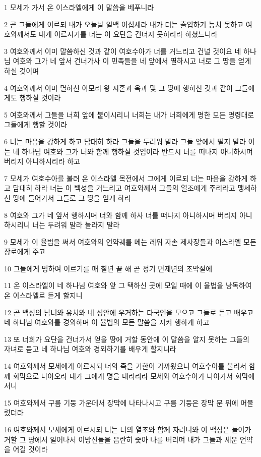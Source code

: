 \par 1 모세가 가서 온 이스라엘에게 이 말씀을 베푸니라
\par 2 곧 그들에게 이르되 내가 오늘날 일백 이십세라 내가 더는 출입하기 능치 못하고 여호와께서도 내게 이르시기를 너는 이 요단을 건너지 못하리라 하셨느니라
\par 3 여호와께서 이미 말씀하신 것과 같이 여호수아가 너를 거느리고 건널 것이요 네 하나님 여호와 그가 네 앞서 건너가사 이 민족들을 네 앞에서 멸하시고 너로 그 땅을 얻게 하실 것이며
\par 4 여호와께서 이미 멸하신 아모리 왕 시혼과 옥과 및 그 땅에 행하신 것과 같이 그들에게도 행하실 것이라
\par 5 여호와께서 그들을 너희 앞에 붙이시리니 너희는 내가 너희에게 명한 모든 명령대로 그들에게 행할 것이라
\par 6 너는 마음을 강하게 하고 담대히 하라 그들을 두려워 말라 그들 앞에서 떨지 말라 이는 네 하나님 여호와 그가 너와 함께 행하실 것임이라 반드시 너를 떠나지 아니하시며 버리지 아니하시리라 하고
\par 7 모세가 여호수아를 불러 온 이스라엘 목전에서 그에게 이르되 너는 마음을 강하게 하고 담대히 하라 너는 이 백성을 거느리고 여호와께서 그들의 열조에게 주리라고 맹세하신 땅에 들어가서 그들로 그 땅을 얻게 하라
\par 8 여호와 그가 네 앞서 행하시며 너와 함께 하사 너를 떠나지 아니하시며 버리지 아니하시리니 너는 두려워 말라 놀라지 말라
\par 9 모세가 이 율법을 써서 여호와의 언약궤를 메는 레위 자손 제사장들과 이스라엘 모든 장로에게 주고
\par 10 그들에게 명하여 이르기를 매 칠년 끝 해 곧 정기 면제년의 초막절에
\par 11 온 이스라엘이 네 하나님 여호와 앞 그 택하신 곳에 모일 때에 이 율법을 낭독하여 온 이스라엘로 듣게 할지니
\par 12 곧 백성의 남녀와 유치와 네 성안에 우거하는 타국인을 모으고 그들로 듣고 배우고 네 하나님 여호와를 경외하며 이 율법의 모든 말씀을 지켜 행하게 하고
\par 13 또 너희가 요단을 건너가서 얻을 땅에 거할 동안에 이 말씀을 알지 못하는 그들의 자녀로 듣고 네 하나님 여호와 경외하기를 배우게 할지니라
\par 14 여호와께서 모세에게 이르시되 너의 죽을 기한이 가까왔으니 여호수아를 불러서 함께 회막으로 나아오라 내가 그에게 명을 내리리라 모세와 여호수아가 나아가서 회막에 서니
\par 15 여호와께서 구름 기둥 가운데서 장막에 나타나시고 구름 기둥은 장막 문 위에 머물렀더라
\par 16 여호와께서 모세에게 이르시되 너는 너의 열조와 함께 자려니와 이 백성은 들어가 거할 그 땅에서 일어나서 이방신들을 음란히 좇아 나를 버리며 내가 그들과 세운 언약을 어길 것이라
